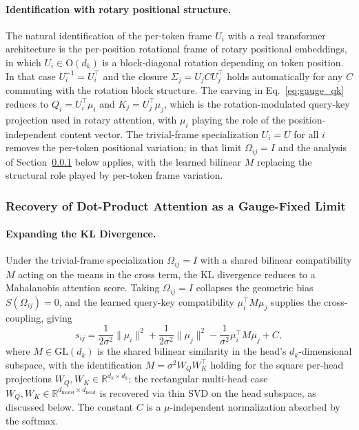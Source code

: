 \documentclass[11pt]{article}
\begin{document}
\paragraph{Identification with rotary positional structure.}
The natural identification of the per-token frame $U_i$ with a real transformer architecture is the per-position rotational frame of rotary positional embeddings, in which $U_i \in \mathrm{O}(d_k)$ is a block-diagonal rotation depending on token position. In that case $U_i^{-1} = U_i^\top$ and the closure $\Sigma_j = U_j C U_j^\top$ holds automatically for any $C$ commuting with the rotation block structure. The carving in Eq.~\eqref{eq:gauge_qk} reduces to $Q_i = U_i^\top\mu_i$ and $K_j = U_j^\top\mu_j$, which is the rotation-modulated query-key projection used in rotary attention, with $\mu_i$ playing the role of the position-independent content vector. The trivial-frame specialization $U_i = U$ for all $i$ removes the per-token positional variation; in that limit $\Omega_{ij} = I$ and the analysis of Section~\ref{sec:dot_product_derivation} below applies, with the learned bilinear $M$ replacing the structural role played by per-token frame variation.

\subsubsection{Recovery of Dot-Product Attention as a Gauge-Fixed Limit}
\label{sec:dot_product_derivation}

\paragraph{Expanding the KL Divergence.}
Under the trivial-frame specialization $\Omega_{ij} = I$ with a shared bilinear compatibility $M$ acting on the means in the cross term, the KL divergence reduces to a Mahalanobis attention score. Taking $\Omega_{ij} = I$ collapses the geometric bias $S(\Omega_{ij}) = 0$, and the learned query-key compatibility $\mu_i^\top M \mu_j$ supplies the cross-coupling, giving
\begin{equation}
s_{ij} = \frac{1}{2\sigma^2}\|\mu_i\|^2 + \frac{1}{2\sigma^2}\|\mu_j\|^2 - \frac{1}{\sigma^2}\mu_i^\top M \mu_j + C,
\end{equation}
where $M \in \mathrm{GL}(d_k)$ is the shared bilinear similarity in the head's $d_k$-dimensional subspace, with the identification $M = \sigma^2 W_Q W_K^\top$ holding for the square per-head projections $W_Q, W_K \in \mathbb{R}^{d_k \times d_k}$; the rectangular multi-head case $W_Q, W_K \in \mathbb{R}^{d_{\text{model}}\times d_{\text{head}}}$ is recovered via thin SVD on the head subspace, as discussed below. The constant $C$ is a $\mu$-independent normalization absorbed by the softmax.
\end{document}
